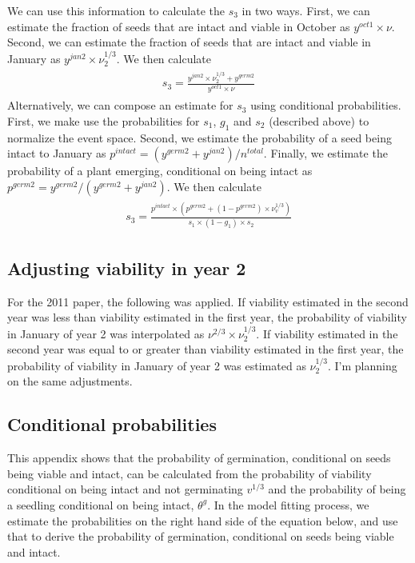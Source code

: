 \documentclass[12pt, oneside]{article}   	%
\begin{document}
We can use this information to calculate the $s_3$ in two ways. First, we can estimate the fraction of seeds that are intact and viable in October as $y^{oct1}\times \nu$. Second, we can estimate the fraction of seeds that are intact and viable in January as $y^{jan2}\times \nu_2^{1/3}$. We then calculate 
%
    \begin{align}
\begin{split}
s_3 = \frac{y^{jan2}\times \nu_2^{1/3} + y^{germ2}}{y^{oct1}\times \nu}
  \end{split}
\end{align}
%
Alternatively, we can compose an estimate for $s_3$ using conditional probabilities. First, we make use the probabilities for $s_1$, $g_1$ and $s_2$ (described above) to normalize the event space. Second, we estimate the probability of a seed being intact to January as $p^{intact} = (y^{germ2}+y^{jan2})/n^{total}$. Finally, we estimate the probability of a plant emerging, conditional on being intact as $p^{germ2} = y^{germ2}/(y^{germ2}+y^{jan2})$. We then calculate 
%
    \begin{align}
\begin{split}
s_3 = \frac{p^{intact} \times (p^{germ2} + ( 1- p^{germ2} ) \times \nu_v^{1/3} )}{s_1 \times (1-g_1) \times s_2 }
  \end{split}
\end{align}
%

\subsection*{Adjusting viability in year 2}

For the 2011 paper, the following was applied. If viability estimated in the second year was less than viability estimated in the first year, the probability of viability in January of year 2 was interpolated as $\nu^{2/3} \times \nu_2^{1/3} $. If viability estimated in the second year was equal to or greater than viability estimated in the first year, the probability of viability in January of year 2 was estimated as $\nu_2^{1/3} $. I'm planning on the same adjustments. 

\iffalse

\subsection*{Conditional probabilities}
This appendix shows that the probability of germination, conditional on seeds being viable and intact, can be calculated from the probability of viability conditional on being intact and not germinating $v^{1/3}$ and the probability of being a seedling conditional on being intact, $\theta^g$. In the model fitting process, we estimate the probabilities on the right hand side of the equation below, and use that to derive the probability of germination, conditional on seeds being viable and intact.
\end{document}
